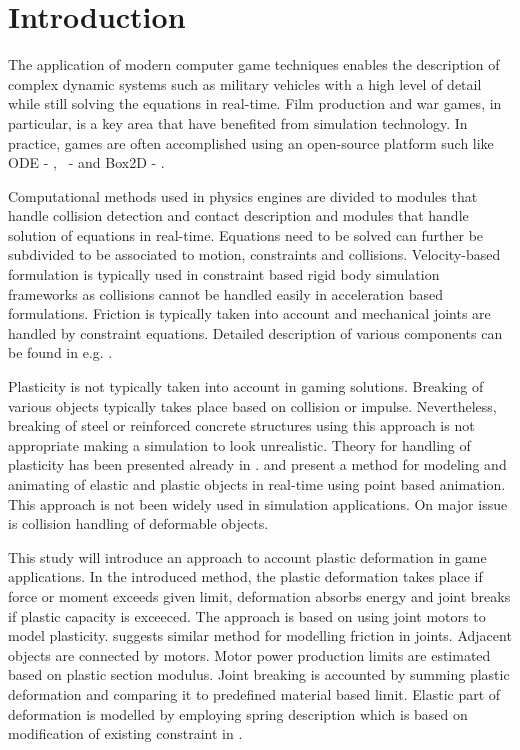 \section{Introduction}

The application of modern computer game techniques enables the description of complex dynamic systems such as military vehicles with a high level of detail while still solving the equations in real-time. Film production and war games, in particular, is a key area that have benefited from simulation technology. In practice, games are often accomplished using an open-source platform such like ODE - \cite{ode}, \bullet\ - \cite{bullet} and Box2D - \cite{box2d}.

Computational methods used in physics engines are divided to modules that handle collision detection and contact description and modules that handle solution of equations in real-time. Equations need to be solved can further be subdivided to be associated to motion, constraints and collisions. Velocity-based formulation is typically used in constraint based rigid body simulation frameworks as collisions cannot be handled easily in acceleration based formulations. Friction is typically taken into account and mechanical joints are handled by constraint equations. Detailed description of various components can be found in e.g. \cite{erleben.thesis}.

Plasticity is not typically taken into account in gaming solutions. Breaking of various objects typically takes place based on collision or impulse. Nevertheless, breaking of steel or reinforced concrete structures using this approach is not appropriate making a simulation to look unrealistic. Theory for handling of plasticity has been presented already in \cite{cg1988}. \cite{muller2004point} and \cite{muller2005meshless} present a method for modeling and animating of elastic and plastic objects in real-time using point based animation. This approach is not been widely used in simulation applications.  On major issue is collision handling of deformable objects.

This study will introduce an approach to account plastic deformation in game applications.   In the introduced method, the plastic deformation takes place if force or moment exceeds given limit, deformation absorbs energy and joint breaks if plastic capacity is exceeced. The approach is based on using joint motors to model plasticity. \cite[p.~90]{erleben.thesis} suggests similar method for modelling friction in joints. Adjacent objects are connected by motors. Motor power production limits are estimated based on plastic section modulus. Joint breaking is accounted by summing plastic deformation and comparing it to predefined material based limit. Elastic part of deformation is modelled by employing spring description which is based on modification of existing constraint in \bullet.

